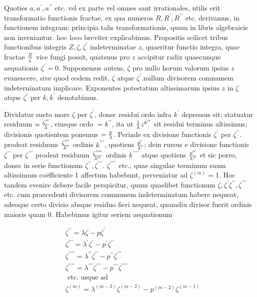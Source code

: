 \documentclass[twoside,12pt, showframe]{memoir}
\let\oldfrac\frac
\def\frac#1#2{\mathchoice{\tfrac{#1}{#2}}{\oldfrac{#1}{#2}}{\genfrac{}{}{}{2}{#1}{#2\mathstrut}}{\genfrac{}{}{}{3}{#1}{#2\mathstrut}}}
\begin{document}
Quoties \(a, a^{\prime}, a^{\prime \prime}\) etc. vel ex parte vel omnes sant irrationales, utilis erit transformatio functionis fractae, ex qua numeros \(R, R^{\prime}, R^{\prime \prime}\) etc. derivamus, in functionem integram: principia talis transformationis, quum in libris algebraicis non inveniantur. hoc loco breviter explicabimus. Propositis scilicet tribus functionibus integris \(Z, \zeta, \zeta^{\prime}\) indeterminatae \(z\), quaeritur functio integra, quae fractae \(\frac{Z}{\zeta}\) vice fungi possit, quatenus pro \(z\) accipitur radix quaecunque aequationis \(\zeta^{\prime}=0\). Supponemus autem, \(\zeta\) pro nullo horum valorum ipsius \(z\) evanescere, sive quod eodem redit, \(\zeta\) atque \(\zeta^{\prime}\).nullum divisorem communem indeterninatum implicare. Exponentes potestatum altissimarum ipsius \(z\) in \(\zeta\) atque \(\zeta^{\prime}\) per \(k, k^{\prime}\) denotabimus.

Dividatur sueto more \(\zeta\) per \(\zeta^{\prime}\), donec residui ordo infra \(k^{\prime}\) depressus sit; statuatur residuum \(=\frac{\zeta^{\prime \prime}}{\lambda}\), eiusque ordo \(=k^{\prime \prime}\), ita ut \(\frac{1}{\lambda} z^{k^{\prime \prime}}\) sit residui terminus altissimus; divisionis quotientem ponemus \(=\frac{p}{\lambda}\). Perinde ex divisione functionis \(\zeta^{\prime}\) per \(\zeta^{\prime \prime}\). prodeat residuum \(\frac{\zeta^{\prime \prime \prime}}{\lambda^{\prime}}\) ordinis \(k^{\prime \prime \prime}\), quotiens \(\frac{p^{\prime}}{\lambda^{\prime}}\); dein rursus e divisione functionis \(\zeta^{\prime \prime}\) per \(\zeta^{\prime \prime \prime}\) prodeat residuum \(\frac{\zeta^{\prime \prime \prime \prime}}{\lambda^{\prime \prime}}\) ordinis \(k^{\prime \prime \prime \prime}\) atque quotiens \(\frac{p^{\prime \prime}}{\lambda^{\prime \prime}}\) et sic porro, donec in serie functionum \(\zeta^{\prime \prime}, \zeta^{\prime \prime \prime}\). \(\zeta^{\prime \prime \prime \prime}\) etc., quae singulae terminum suum altissimum coëfficiente 1 affectum habebunt, perveniatur ad \(\zeta^{(m)}=1\). Hoc tandem evenire debere facile perspicitur, quum quaelibet functionum \(\zeta, \zeta^{\prime} \zeta^{\prime \prime}, \zeta^{\prime \prime \prime}\) etc. cum praecedenti divisorem communem indeterminatum habere nequeat, adeoque certo divisio absque residuo fieri nequeat, quamdiu divisor fuerit ordinis maioris quam 0. Habebimus igitur seriem aequationum

\[
\begin{aligned}
& \zeta^{\prime \prime}=\lambda \zeta-p \zeta^{\prime} \\
& \zeta^{\prime \prime \prime}=\lambda^{\prime} \zeta^{\prime}-p^{\prime} \zeta^{\prime \prime} \\
& \zeta^{\prime \prime \prime \prime}=\lambda^{\prime \prime} \zeta^{\prime \prime}-p^{\prime \prime} \zeta^{\prime \prime \prime} \\
& \zeta^{\prime \prime \prime \prime}=\lambda^{\prime \prime \prime} \zeta^{\prime \prime \prime}-p^{\prime \prime \prime} \zeta^{\prime \prime \prime \prime} \\
& \text { etc. usque ad } \\
& \zeta^{(m)}=\lambda^{(m-2)} \zeta^{(m-2)}-p^{(m-2)} \zeta^{(m-1)}
\end{aligned}
\]
\end{document}
